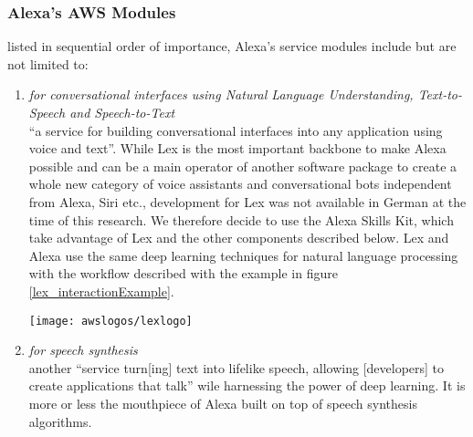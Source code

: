 \subsubsection*{Alexa's AWS Modules }

listed in sequential order of importance, Alexa's service modules include but are not limited to: 

\begin{enumerate}

	\item[\href{https://aws.amazon.com/lex/}{\textbf{Lex}} \footnote{\url{https://aws.amazon.com/lex}}] \textit{for conversational interfaces using Natural Language Understanding, Text-to-Speech and Speech-to-Text} \\
	``a service for building conversational interfaces into any application using voice and text''\cite{aws_website}.
	While Lex is the most important backbone to make Alexa possible and can be a main operator of another software package to create a whole new category of voice assistants and conversational bots independent from Alexa, Siri etc., development for Lex was not available in German at the time of this research. We therefore decide to use the Alexa Skills Kit, which take advantage of Lex and the other components described below. Lex and Alexa use the same deep learning techniques for natural language processing with the workflow described with the example in figure \ref{lex_interactionExample}.
	
	\begin{restoretext}
		\begin{flushright}
			\texttt{[image: awslogos/lexlogo]}
		\end{flushright}

	\end{restoretext}

	
	
	\item[\href{https://aws.amazon.com/polly/}{\textbf{Polly}} \footnote{\url{https://aws.amazon.com/polly}}] \textit{for speech synthesis\\}
	another ``service turn[ing] text into lifelike speech, allowing [developers] to create applications that talk'' \cite{aws_website} wile harnessing the power of deep learning. It is more or less the mouthpiece of Alexa built on top of speech synthesis algorithms.
	

\end{enumerate}
